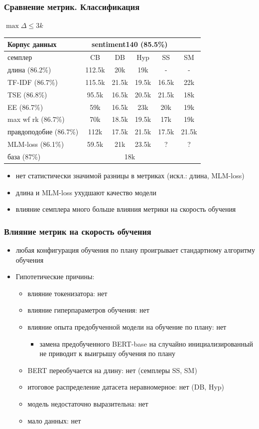 \documentclass{beamer}
\begin{document}
\begin{frame}
	\frametitle{Сравнение метрик. Классификация}
	$\max\Delta \le 3k$
	\begin{table}
		\begin{tabular}{l|ccccc}
			Корпус данных & \multicolumn{4}{c}{sentiment140 (85.5\%)}\\
			\hline
			семплер & CB & DB & Hyp & SS & SM\\
			\hline
			длина (86.2\%) & 112.5k & 20k & 19k & - & -\\
			TF-IDF (86.7\%) & 115.5k & 21.5k & 19.5k & 16.5k & 22k\\
			TSE (86.8\%) & 95.5k & 16.5k & 20.5k & 21.5k & 18k\\
			EE (86.7\%) & 59k & 16.5k & 23k & 20k & 19k\\
			max wf rk (86.7\%) & 70k & 18.5k & 19.5k & 17k & 19k\\
			правдоподобие (86.7\%) & 112k & 17.5k & 21.5k & 17.5k & 21.5k\\
			MLM-loss (86.1\%) & 59.5k & 21k & 23.5k & ? & ?\\
			\hline
			база (87\%) & \multicolumn{4}{c}{18k}
		\end{tabular}
	\end{table}
	\begin{itemize}
		\item нет статистически значимой разницы в метриках (искл.: длина, MLM-loss)
		\item длина и MLM-loss ухудшают качество модели
		\item влияние семплера много больше влияния метрики на скорость обучения
	\end{itemize}
\end{frame}

\begin{frame}
	\frametitle{Влияние метрик на скорость обучения}
	\begin{itemize}
		\item любая конфигурация обучения по плану проигрывает стандартному алгоритму обучения
		\item Гипотетические причины:
		\begin{itemize}
			\item влияние токенизатора: нет
			\item влияние гиперпараметров обучения: нет
			\item влияние опыта предобученной модели на обучение по плану: нет
			\begin{itemize}
				\item замена предобученного BERT-base на случайно инициализированный не приводит к выигрышу обучения по плану
			\end{itemize}
			\item BERT переобучается на длину: нет (семплеры SS, SM)
			\item итоговое распределение датасета неравномерное: нет (DB, Hyp)
			\item модель недостаточно выразительна: нет
			\item мало данных: нет
		\end{itemize}
	\end{itemize}
\end{frame}
\end{document}
